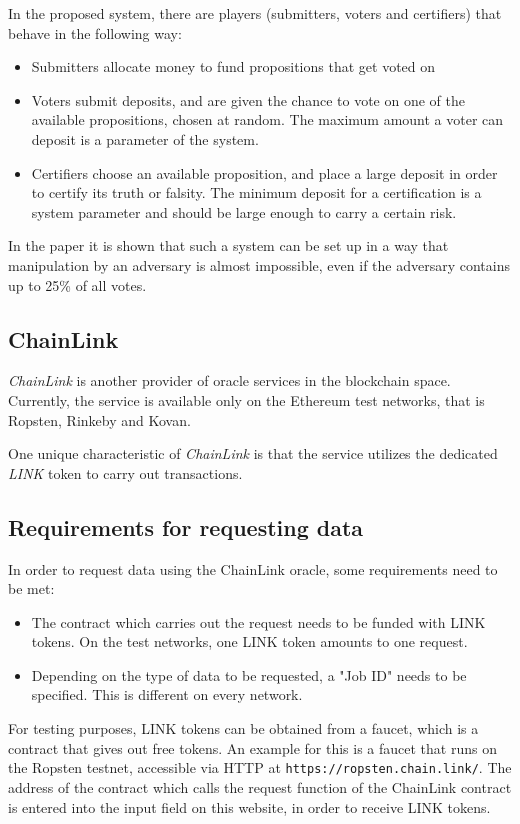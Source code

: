 In the proposed system, there are players (submitters, voters and certifiers) that behave in the following way:
\begin{itemize}
	\item Submitters allocate money to fund propositions that get voted on
	\item Voters submit deposits, and are given the chance to vote on one of the available propositions, chosen at random. The maximum amount a voter can deposit is a parameter of the system.
	\item Certifiers choose an available proposition, and place a large deposit in order to certify its truth or falsity. The minimum deposit for a certification is a system parameter and should be large enough to carry a certain risk.
\end{itemize}
In the paper it is shown that such a system can be set up in a way that manipulation by an adversary is almost impossible, even if the adversary contains up to 25\% of all votes\cite{astraea}.

\subsection{ChainLink}
\emph{ChainLink} is another provider of oracle services in the blockchain space. Currently, the service is available only on the Ethereum test networks, that is Ropsten, Rinkeby and Kovan.

One unique characteristic of \emph{ChainLink} is that the service utilizes the dedicated \emph{LINK} token to carry out transactions. 
\subsection*{Requirements for requesting data}
In order to request data using the ChainLink oracle, some requirements need to be met:
\begin{itemize}
	\item The contract which carries out the request needs to be funded with  LINK tokens. On the test networks, one LINK token amounts to one request.
	\item Depending on the type of data to be requested, a "Job ID" needs to be specified. This is different on every network.
\end{itemize}
For testing purposes, LINK tokens can be obtained from a faucet, which is a contract that gives out free tokens. An example for this is a faucet that runs on the Ropsten testnet, accessible via HTTP at \texttt{https://ropsten.chain.link/}. The address of the contract which calls the request function of the ChainLink contract is entered into the input field on this website, in order to receive LINK tokens.

